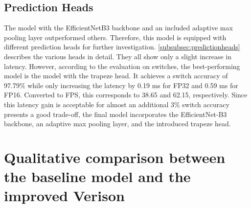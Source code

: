 \subsection{Prediction Heads}

\begin{table}[H]
    \centering
    \caption{Prediction Heads Results}
    \label{tab:predHeadsResults}
\end{table}

The model with the EfficientNetB3 backbone and an included adaptive max pooling layer outperformed others.
Therefore, this model is equipped with different prediction heads for further investigation.
\autoref{subsubsec:predictionheads} describes the various heads in detail.
They all show only a slight increase in latency.
However, according to the evaluation on switches, the best-performing model is the model with the trapeze head.
It achieves a switch accuracy of 97.79\% while only increasing the latency by 0.19 ms for FP32 and 0.59 ms for FP16.
Converted to \ac{FPS}, this corresponds to 38.65 and 62.15, respectively.
Since this latency gain is acceptable for almost an additional 3\% switch accuracy presents a good trade-off, the final model incorporates the EfficientNet-B3 backbone, an adaptive max pooling layer, and the introduced trapeze head.

\section{Qualitative comparison between the baseline model and the improved Verison}

